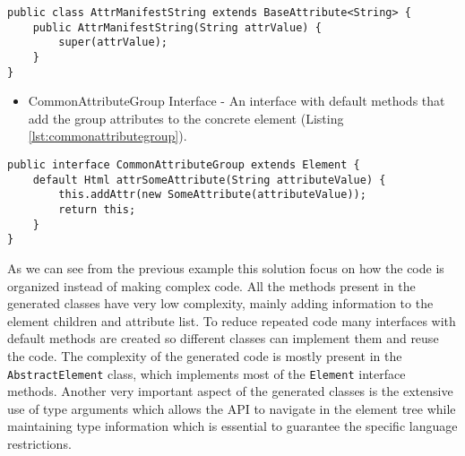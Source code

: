 \bigskip


\begin{minipage}{\linewidth}
\begin{lstlisting}[caption={Manifest Attribute Class},captionpos=b,label={lst:manifestattributeclass}]
public class AttrManifestString extends BaseAttribute<String> {
    public AttrManifestString(String attrValue) {
        super(attrValue);
    }
}
\end{lstlisting}
\end{minipage}

\begin{itemize}
	\item CommonAttributeGroup Interface - An interface with default methods that add the group attributes to the concrete element (Listing \ref{lst:commonattributegroup}).
\end{itemize}

\bigskip


\begin{minipage}{\linewidth}
\begin{lstlisting}[caption={CommonAttributeGroup Interface},captionpos=b,label={lst:commonattributegroup}]
public interface CommonAttributeGroup extends Element {
    default Html attrSomeAttribute(String attributeValue) {
        this.addAttr(new SomeAttribute(attributeValue));
        return this;
    }
}
\end{lstlisting}
\end{minipage}

\noindent
As we can see from the previous example this solution focus on how the code is organized instead of making complex code. All the methods present in the generated classes have very low complexity, mainly adding information to the element children and attribute list. To reduce repeated code many interfaces with default methods are created so different classes can implement them and reuse the code. The complexity of the generated code is mostly present in the \texttt{AbstractElement} class, which implements most of the \texttt{Element} interface methods. Another very important aspect of the generated classes is the extensive use of type arguments which allows the \ac{API} to navigate in the element tree while maintaining type information which is essential to guarantee the specific language restrictions.

